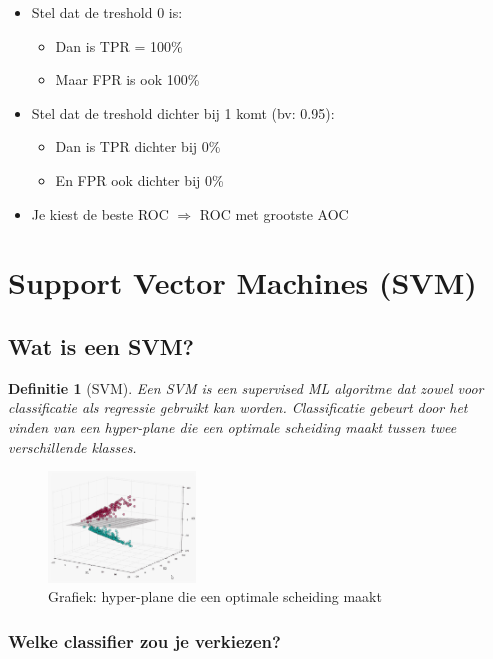 \documentclass{article}
\newtheorem{theorem}{Definitie}[section]
\begin{document}
\begin{itemize}
    \item Stel dat de treshold 0 is:
    \begin{itemize}
        \item Dan is TPR = 100\%
        \item Maar FPR is ook 100\%
    \end{itemize}
    \item Stel dat de treshold dichter bij 1 komt (bv: 0.95):
    \begin{itemize}
        \item Dan is TPR dichter bij 0\%
        \item En FPR ook dichter bij 0\%
    \end{itemize}
    \item Je kiest de beste ROC $\Rightarrow$ ROC met grootste AOC
\end{itemize}

\section{Support Vector Machines (SVM)}

\subsection{Wat is een SVM?}

\begin{theorem}[SVM]
Een SVM is een supervised ML algoritme dat zowel voor classificatie als regressie
gebruikt kan worden. Classificatie gebeurt door het vinden van een hyper-plane die
een optimale scheiding maakt tussen twee verschillende klasses.
\end{theorem}

\begin{figure}[H]
    \centering
    \includegraphics[width=0.35\textwidth]{svm.png}
    \caption{Grafiek: hyper-plane die een optimale scheiding maakt}
\end{figure}

\subsubsection{Welke classifier zou je verkiezen?}
\end{document}
